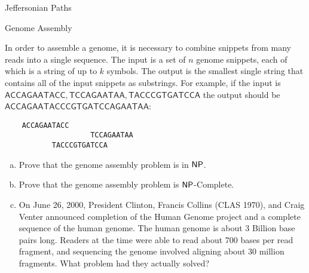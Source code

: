 \documentclass[11pt]{article}
\begin{document}
\begin{problem}
Jeffersonian Paths
\end{problem}


\begin{problem}
Genome Assembly
\end{problem}

In order to assemble a genome, it is necessary to combine snippets from many reads into a single sequence. The input is a set of $n$ genome snippets,
each of which is a string of up to $k$ symbols. The output is the smallest single string that contains all of the input snippets as substrings. For example, if the input is ${\mathsf{ACCAGAATACC}, \mathsf{TCCAGAATAA}, \mathsf{TACCCGTGATCCA}}$
the output should be $\mathsf{ACCAGAATACCCGTGATCCAGAATAA}$:
\begin{verbatim}
    ACCAGAATACC
                    TCCAGAATAA
           TACCCGTGATCCA
\end{verbatim}

\begin{enumerate}[(a)]
\item Prove that the genome assembly problem is in $\mathsf{NP}$.
\item Prove that the genome assembly problem is $\mathsf{NP}$-Complete.
\item On June 26, 2000, President Clinton, Francis Collins (CLAS 1970), and Craig Venter announced completion of the Human Genome project and a complete sequence of the human genome. The human genome is about 3 Billion base pairs long. Readers at the time were able to read about 700 bases per read fragment, and sequencing the genome involved aligning about 30 million fragments. What problem had they actually solved?
\end{enumerate}
\end{document}
